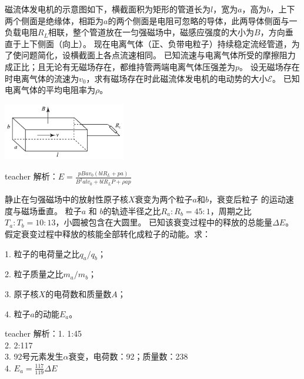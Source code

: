 \begin{example}
磁流体发电机的示意图如下，横截面积为矩形的管道长为$l$，宽为$a$，高为$b$，上下两个侧面是绝缘体，相距为$a$的两个侧面是电阻可忽略的导体，此两导体侧面与一负载电阻$R_L$相联，整个管道放在一匀强磁场中，磁感应强度的大小为$B$，方向垂直于上下侧面（向上）。
现在电离气体（正、负带电粒子）持续稳定流经管道，为了使问题简化，设横截面上各点流速相同。
已知流速与电离气体所受的摩擦阻力成正比；且无论有无磁场存在，都维持管两端电离气体压强差为$p$。
设无磁场存在时电离气体的流速为$v_0$，求有磁场存在时此磁流体发电机的电动势的大小$\mathcal{E}$。
已知电离气体的平均电阻率为$\rho$。
\begin{flushright}
\includegraphics[width = 0.4\textwidth]{images/mag-37.pdf} 
\end{flushright}

\begin{taggedblock}{teacher}
\noindent
解析：$E=\frac{pBav_0(blR_L+pa)}{B^2alv_0+blR_LP+\rho ap}$
\end{taggedblock}
\end{example}

\begin{example}
静止在匀强磁场中的放射性原子核$X$衰变为两个粒子$a$和$ b $，衰变后粒子 的运动速度与磁场垂直。
粒子$ a $ 和 $ b $的轨迹半径之比$ R_a:R_b = 45:1 $，周期之比$ T_a:T_b = 10:13 $，小圆被包含在大圆里。
已知该衰变过程中的释放的总能量$\Delta E$。
假定衰变过程中释放的核能全部转化成粒子的动能。求：

1. 粒子的电荷量之比$q_a/q_b$；

2. 粒子质量之比$m_a/m_b$；

3. 原子核$X$的电荷数和质量数$A$；

4. 粒子$a$的动能$E_a$。

\begin{taggedblock}{teacher}
\noindent
解析：1. 1:45
\\2. 2:117
\\3. 92号元素发生$\alpha $衰变，电荷数：92；质量数：238
\\4. $E_a=\frac{117}{119}\Delta E$
\end{taggedblock}
\end{example}

